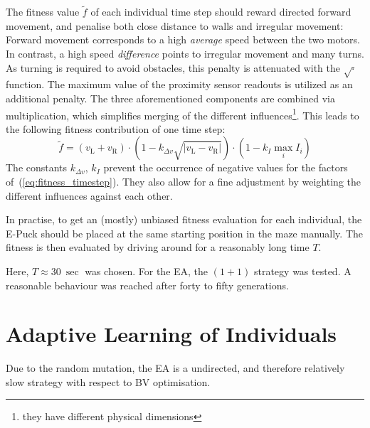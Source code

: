\documentclass[a4paper]{article}
\begin{document}
The fitness value $\tilde{f}$ of each individual time step should reward directed forward movement, and penalise both close distance to walls and irregular movement: Forward movement corresponds to a high \emph{average} speed between the two motors. In contrast, a high speed \emph{difference} points to irregular movement and many turns. As turning is required to avoid obstacles, this penalty is attenuated with the $\sqrt{\cdot}$ function. The maximum value of the proximity sensor readouts is utilized as an additional penalty. The three aforementioned components are combined via multiplication, which simplifies merging of the different influences\footnote{they have different physical dimensions}. This leads to the following fitness contribution of one time step:
\begin{equation}
	\tilde{f} = \left( v_\mathrm{L} + v_\mathrm{R} \right) \cdot \left( 1 - k_{\Delta v}\sqrt{|v_\mathrm{L}-v_\mathrm{R}|} \right) \cdot \left(1- k_{I} \max\limits_i I_i\right)
	\label{eq:fitness_timestep} 
\end{equation}
The constants $k_{\Delta v}$, $k_I$ prevent the occurrence of negative values for the factors of~(\ref{eq:fitness_timestep}). They also allow for a fine adjustment by weighting the different influences against each other.

In practise, to get an (mostly) unbiased fitness evaluation for each individual, the E-Puck should be placed at the same starting position in the maze manually. The fitness is then evaluated by driving around for a reasonably long time $T$. 

Here, $T\approx\SI{30}{\sec}$ was chosen. For the EA, the $(1+1)$ strategy was tested. A reasonable behaviour was reached after forty to fifty generations.


\section{Adaptive Learning of Individuals}

Due to the random mutation, the EA is a undirected, and therefore relatively slow strategy with respect to BV optimisation. 
\end{document}
